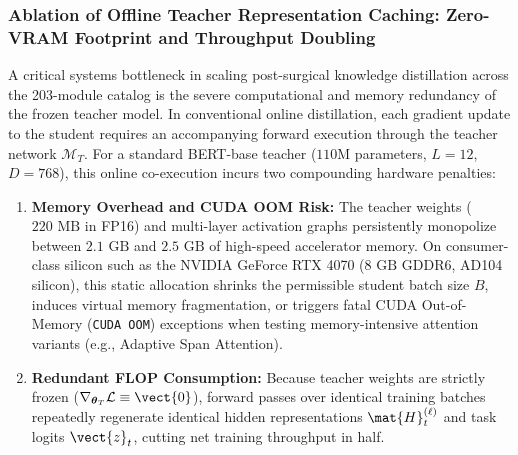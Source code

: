 \subsubsection{Ablation of Offline Teacher Representation Caching: Zero-VRAM Footprint and Throughput Doubling}
\label{sec:ablations_offline_teacher_caching}

A critical systems bottleneck in scaling post-surgical knowledge distillation across the 203-module catalog is the severe computational and memory redundancy of the frozen teacher model. In conventional online distillation, each gradient update to the student requires an accompanying forward execution through the teacher network $\mathcal{M}_T$. For a standard BERT-base teacher ($110\text{M}$ parameters, $L=12$, $D=768$), this online co-execution incurs two compounding hardware penalties:
\begin{enumerate}
    \item \textbf{Memory Overhead and CUDA OOM Risk:} The teacher weights ($220\text{ MB}$ in FP16) and multi-layer activation graphs persistently monopolize between $2.1\text{ GB}$ and $2.5\text{ GB}$ of high-speed accelerator memory. On consumer-class silicon such as the NVIDIA GeForce RTX 4070 ($8\text{ GB}$ GDDR6, AD104 silicon), this static allocation shrinks the permissible student batch size $B$, induces virtual memory fragmentation, or triggers fatal CUDA Out-of-Memory (\texttt{CUDA OOM}) exceptions when testing memory-intensive attention variants (e.g., Adaptive Span Attention).
    \item \textbf{Redundant FLOP Consumption:} Because teacher weights are strictly frozen ($\nabla_{\boldsymbol{\theta}_T} \mathcal{L} \equiv \vect{0}$), forward passes over identical training batches repeatedly regenerate identical hidden representations $\mat{H}_t^{(\ell)}$ and task logits $\vect{z}_t$, cutting net training throughput in half.
\end{enumerate}


